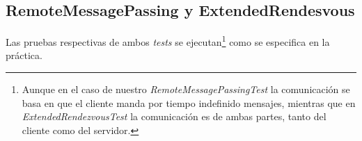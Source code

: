 \documentclass[12pt]{article}
\begin{document}
\subsection{RemoteMessagePassing y ExtendedRendesvous}
Las pruebas respectivas de ambos \textit{tests} se ejecutan\footnote{Aunque en el caso de nuestro \textit{RemoteMessagePassingTest} la comunicación se basa en que el cliente manda por tiempo indefinido mensajes, mientras que en \textit{ExtendedRendezvousTest} la comunicación es de ambas partes, tanto del cliente como del servidor.} como se especifica en la práctica.
\end{document}
